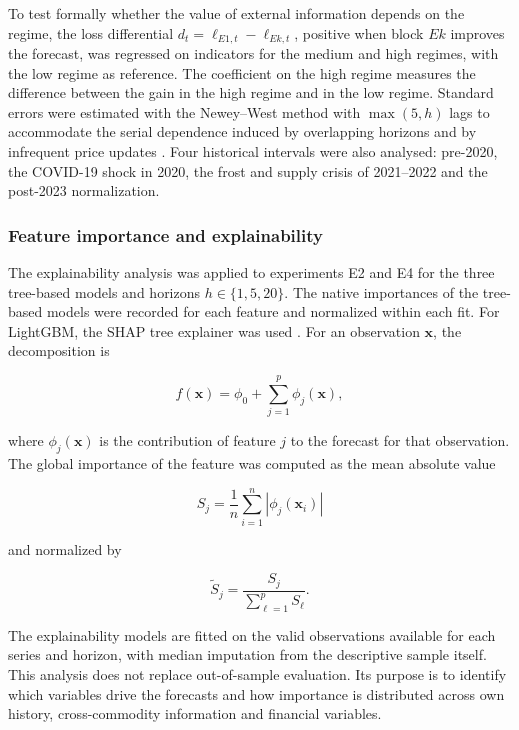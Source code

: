 \documentclass[a4paper,fleqn]{cas-sc}
\begin{document}
To test formally whether the value of external information depends on the regime, the loss differential \(d_t=\ell_{E1,t}-\ell_{Ek,t}\), positive when block \(Ek\) improves the forecast, was regressed on indicators for the medium and high regimes, with the low regime as reference. The coefficient on the high regime measures the difference between the gain in the high regime and in the low regime. Standard errors were estimated with the Newey--West method with \(\max(5,h)\) lags to accommodate the serial dependence induced by overlapping horizons and by infrequent price updates \citep{NeweyWest1987}. Four historical intervals were also analysed: pre-2020, the COVID-19 shock in 2020, the frost and supply crisis of 2021--2022 and the post-2023 normalization.

\subsubsection{Feature importance and explainability}
\label{subsec:explainability}

The explainability analysis was applied to experiments E2 and E4 for the three tree-based models and horizons \(h\in\{1,5,20\}\). The native importances of the tree-based models were recorded for each feature and normalized within each fit. For LightGBM, the SHAP tree explainer was used \citep{LundbergLee2017SHAP}. For an observation \(\mathbf{x}\), the decomposition is

\begin{equation}
f(\mathbf{x})
=
\phi_{0}
+\sum_{j=1}^{p}\phi_{j}(\mathbf{x}),
\label{eq:shap_decomposition}
\end{equation}

where \(\phi_j(\mathbf{x})\) is the contribution of feature \(j\) to the forecast for that observation. The global importance of the feature was computed as the mean absolute value

\begin{equation}
S_j
=
\frac{1}{n}\sum_{i=1}^{n}
\left\lvert\phi_j(\mathbf{x}_i)\right\rvert
\label{eq:shap_global}
\end{equation}

and normalized by

\begin{equation}
\widetilde{S}_j
=
\frac{S_j}{\sum_{\ell=1}^{p}S_{\ell}}.
\label{eq:shap_normalized}
\end{equation}

The explainability models are fitted on the valid observations available for each series and horizon, with median imputation from the descriptive sample itself. This analysis does not replace out-of-sample evaluation. Its purpose is to identify which variables drive the forecasts and how importance is distributed across own history, cross-commodity information and financial variables.
\end{document}
